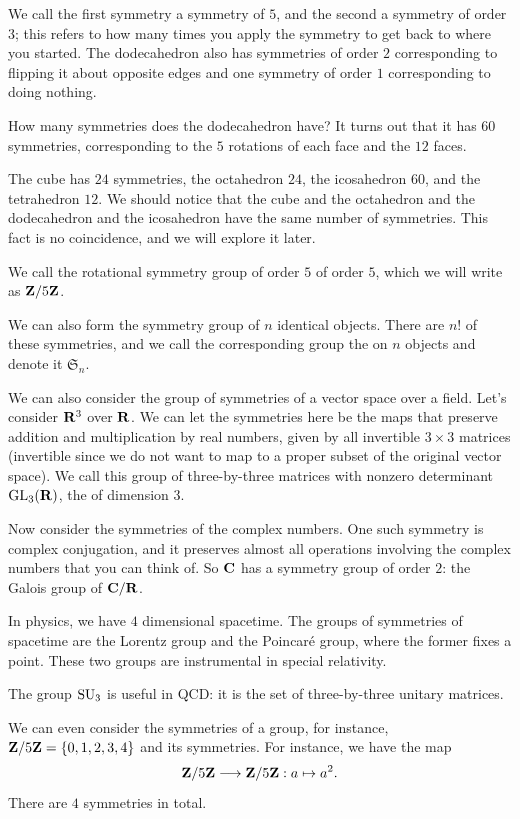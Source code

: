 \documentclass[11pt, twoside]{amsart}
\begin{document}
We call the first symmetry a symmetry of  $5$, and the second a symmetry of order $3$; this refers to how many times you apply the symmetry to get back to where you started. The dodecahedron also has symmetries of order $2$ corresponding to flipping it about opposite edges and one symmetry of order $1$ corresponding to doing nothing. 

How many symmetries does the dodecahedron have? It turns out that it has $60$ symmetries, corresponding to the $5$ rotations of each face and the $12$ faces.

The cube has $24$ symmetries, the octahedron $24$, the icosahedron $60$, and the tetrahedron $12$. We should notice that the cube and the octahedron and the dodecahedron and the icosahedron have the same number of symmetries. This fact is no coincidence, and we will explore it later.

We call the rotational symmetry group of order $5$  of order $5$, which we will write as $\mathbf{Z}/5\mathbf{Z}$.

We can also form the symmetry group of $n$ identical objects. There are $n!$ of these symmetries, and we call the corresponding group the  on $n$ objects and denote it $\mathfrak{S}_n$. 

We can also consider the group of symmetries of a vector space over a field. Let's consider $\mathbf R^3$ over $\mathbf R$. We can let the symmetries here be the maps that preserve addition and multiplication by real numbers, given by all invertible $3\times 3$ matrices (invertible since we do not want to map to a proper subset of the original vector space). We call this group of three-by-three matrices with nonzero determinant $\operatorname{GL}_3(\mathbf R)$, the  of dimension $3$.

Now consider the symmetries of the complex numbers. One such symmetry is complex conjugation, and it preserves almost all operations involving the complex numbers that you can think of. So $\mathbf C$ has a symmetry group of order $2$: the Galois group of $\mathbf C/\mathbf R$.

In physics, we have $4$ dimensional spacetime. The groups of symmetries of spacetime are the Lorentz group and the Poincar\'e group, where the former fixes a point. These two groups are instrumental in special relativity. 

The group $\operatorname{SU}_3$ is useful in QCD: it is the set of three-by-three unitary matrices. 

We can even consider the symmetries of a group, for instance, $\mathbf{Z}/5\mathbf{Z} = \{0,1,2,3,4\}$ and its symmetries. For instance, we have the map
$$
\mathbf{Z}/5\mathbf{Z}\longrightarrow\mathbf{Z}/5\mathbf{Z} : a \mapsto a^2.
$$
There are $4$ symmetries in total.
\end{document}
